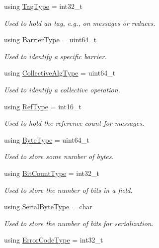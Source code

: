 \begin{DoxyCompactItemize}
using \hyperlink{namespacevt_a84ab281dae04a52a4b243d6bf62d0e52}{Tag\+Type} = int32\+\_\+t
\begin{DoxyCompactList}\small\item\em Used to hold an tag, e.\+g., on messages or reduces. \end{DoxyCompactList}\item 
using \hyperlink{namespacevt_a25e481f0d6bbc7204db23d1c87a62e77}{Barrier\+Type} = uint64\+\_\+t
\begin{DoxyCompactList}\small\item\em Used to identify a specific barrier. \end{DoxyCompactList}\item 
using \hyperlink{namespacevt_a5ffcf8e168b77b0f36e11b616049a1cf}{Collective\+Alg\+Type} = uint64\+\_\+t
\begin{DoxyCompactList}\small\item\em Used to identify a collective operation. \end{DoxyCompactList}\item 
using \hyperlink{namespacevt_a9b39ce9494bb04674d0d5b895a5aa50f}{Ref\+Type} = int16\+\_\+t
\begin{DoxyCompactList}\small\item\em Used to hold the reference count for messages. \end{DoxyCompactList}\item 
using \hyperlink{namespacevt_aab8d55968084610ce3b17057981e9300}{Byte\+Type} = uint64\+\_\+t
\begin{DoxyCompactList}\small\item\em Used to store some number of bytes. \end{DoxyCompactList}\item 
using \hyperlink{namespacevt_acaf7da00eb37dfb0c3479a6a982c30ef}{Bit\+Count\+Type} = int32\+\_\+t
\begin{DoxyCompactList}\small\item\em Used to store the number of bits in a field. \end{DoxyCompactList}\item 
using \hyperlink{namespacevt_ad48e08beb69a7f184fb1fdb4b7044174}{Serial\+Byte\+Type} = char
\begin{DoxyCompactList}\small\item\em Used to store the number of bits for serialization. \end{DoxyCompactList}\item 
using \hyperlink{namespacevt_a793764d753923abc3d32929870beb485}{Error\+Code\+Type} = int32\+\_\+t

\end{DoxyCompactItemize}
